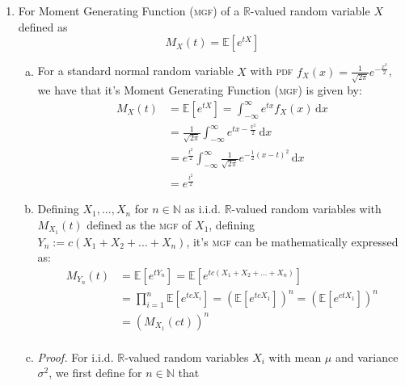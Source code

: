 \documentclass[a4paper,10pt]{article}
\begin{document}
\begin{enumerate}
\begin{enumerate}[(a)]
\begin{enumerate}[1.]
	\end{enumerate}
\end{enumerate}
\pagebreak
\item For Moment Generating Function (\textsc{mgf}) of a $\mathbb{R}$-valued random variable $X$ defined as
\begin{equation*}
	M_X(t)=\mathbb{E}\!\left[e^{tX}\right]
\end{equation*}
\begin{enumerate}[(a)]
	\item \label{3(a)} For a standard normal random variable $X$ with \textsc{pdf} $f_X(x) = \frac{1}{\sqrt{2\pi}} e^{-\frac{x^2}{2}}$, we have that it's Moment Generating Function (\textsc{mgf}) is given by:
	\begin{equation*}
		\begin{aligned}
			M_X(t) &= \mathbb{E}\!\left[e^{tX}\right] = \int_{-\infty}^{\infty} e^{tx}f_X(x)\,\mathrm{d}x \\
			&= \frac{1}{\sqrt{2\pi}} \int_{-\infty}^{\infty} e^{tx-\frac{x^2}{2}}\,\mathrm{d}x \\
			&= e^{\frac{t^2}{2}} \int_{-\infty}^{\infty} \frac{1}{\sqrt{2\pi}} e^{-\frac{1}{2}(x-t)^2}\,\mathrm{d}x \\
			&= e^{\frac{t^2}{2}}
		\end{aligned}
	\end{equation*}
	\item Defining $X_1,...,X_n$ for $n \in \mathbb{N}$ as i.i.d. $\mathbb{R}$-valued random variables with $M_{X_1}(t)$ defined as the \textsc{mgf} of $X_1$, defining $Y_n := c(X_1+X_2+...+X_n)$, it's \textsc{mgf} can be mathematically expressed as:
	\begin{equation*}
		\begin{aligned}
			M_{Y_n}(t) &= \mathbb{E}\!\left[e^{tY_n}\right] = \mathbb{E}\!\left[e^{tc(X_1+X_2+...+X_n)}\right] \\
			&= \prod_{i=1}^{n} \mathbb{E}\!\left[e^{tcX_i} \right ]  = \left(\mathbb{E}\!\left[e^{tcX_1}\!\right]\right)^n = \left(\mathbb{E}\!\left[e^{ctX_1}\!\right]\right)^n \\
			&= \left(M_{X_1}(ct)\right)^n \\
		\end{aligned}
	\end{equation*}
	\item \textit{Proof.} For i.i.d. $\mathbb{R}$-valued random variables $X_i$ with mean $\mu$ and variance $\sigma^2$, we first define for $n \in \mathbb{N}$ that

\end{enumerate}
\end{enumerate}
\end{document}
